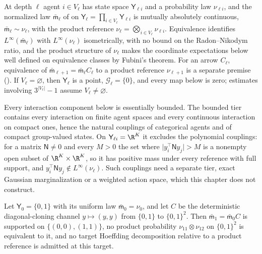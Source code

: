 At depth $\ell$ agent $i\in V_\ell$ has state space $\mathsf Y_{\ell i}$ and a
probability law $\nu_{\ell i}$, and the normalized law $\bar{\mathsf m}_\ell$ of
 on $\mathsf Y_\ell=\prod_{i\in V_\ell}\mathsf Y_{\ell i}$
is mutually absolutely continuous, $\bar{\mathsf m}_\ell\sim\nu_\ell$, with the
product reference $\nu_\ell=\bigotimes_{i\in V_\ell}\nu_{\ell i}$. Equivalence
identifies $L^\infty(\bar{\mathsf m}_\ell)$ with $L^\infty(\nu_\ell)$
isometrically, with no bound on the Radon--Nikodym ratio, and the product
structure of $\nu_\ell$ makes the coordinate expectations below well defined on
equivalence classes by Fubini's theorem. For an arrow $C_\ell$, equivalence of
$\bar{\mathsf m}_{\ell+1}=\bar{\mathsf m}_\ell C_\ell$ to a product reference
$\nu_{\ell+1}$ is a separate premise
(). If $V_\ell=\varnothing$, then
$\mathsf Y_\ell$ is a point, $\mathcal G_\ell=\{0\}$, and every map below is zero;
estimates involving $3^{\lvert V_\ell\rvert}-1$ assume $V_\ell\ne\varnothing$.

Every interaction component below is essentially bounded. The bounded tier contains
every interaction on finite agent spaces and every continuous interaction on
compact ones, hence the natural couplings of categorical agents and of compact
group-valued states. On $\mathsf Y_{\ell i}=\R^K$ it excludes the polynomial
couplings: for a matrix $\mathsf N\ne0$ and every $M>0$ the set where
$\lvert y_i^\top\mathsf Ny_j\rvert>M$ is a nonempty open subset of
$\R^K\times\R^K$, so it has positive mass under every reference with full support,
and $y_i^\top\mathsf Ny_j\notin L^\infty(\nu_\ell)$. Such couplings need a separate
tier, exact Gaussian marginalization or a weighted action space, which this
chapter does not construct. 

Let $\mathsf Y_0=\{0,1\}$ with its uniform law $\bar{\mathsf m}_0=\nu_0$, and let
$C$ be the deterministic diagonal-cloning channel $y\mapsto(y,y)$ from $\{0,1\}$ to
$\{0,1\}^2$. Then $\bar{\mathsf m}_1=\bar{\mathsf m}_0C$ is supported on
$\{(0,0),(1,1)\}$, no product probability $\nu_{11}\otimes\nu_{12}$ on
$\{0,1\}^2$ is equivalent to it, and no target Hoeffding decomposition relative to
a product reference is admitted at this target. 

